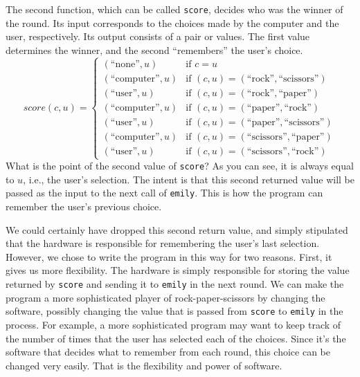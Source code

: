 The second function, which can be called \texttt{score}, decides who
was the winner of the round.  Its input corresponds to the choices
made by the computer and the user, respectively.  Its output consists
of a pair or values.  The first value determines the winner, and the
second ``remembers'' the user's choice.
\begin{displaymath}
score(c,u) =
   \left\{
        \begin{array}{ll}
        (\mbox{``none''}, u)     & \mbox{if } c = u \\
        (\mbox{``computer''}, u) & \mbox{if } (c,u) = (\mbox{``rock''}, \mbox{``scissors''}) \\
        (\mbox{``user''}, u)     & \mbox{if } (c,u) = (\mbox{``rock''}, \mbox{``paper''}) \\
        (\mbox{``computer''}, u) & \mbox{if } (c,u) = (\mbox{``paper''}, \mbox{``rock''}) \\
        (\mbox{``user''}, u)     & \mbox{if } (c,u) = (\mbox{``paper''}, \mbox{``scissors''}) \\
        (\mbox{``computer''}, u) & \mbox{if } (c,u) = (\mbox{``scissors''}, \mbox{``paper''}) \\
        (\mbox{``user''}, u)     & \mbox{if } (c,u) = (\mbox{``scissors''}, \mbox{``rock''})
        \end{array}
   \right.
\end{displaymath}
What is the point of the second value of \texttt{score}?  As you can
see, it is always equal to $u$, i.e., the user's selection.  The
intent is that this second returned value will be passed as the input
to the next call of \texttt{emily}.  This is how the program can
remember the user's previous choice.

We could certainly have dropped this second return value, and simply
stipulated that the hardware is responsible for remembering
the user's last selection.  However, we chose to write the program
in this way for two reasons.  First, it gives us more flexibility.
The hardware is simply responsible for storing the value returned
by \texttt{score} and sending it to \texttt{emily} in the next round.
We can make the program a more sophisticated player of
rock-paper-scissors by changing the software, possibly changing the
value that is passed from \texttt{score} to \texttt{emily} in the
process.  For example, a more sophisticated program may want to
keep track of the number of times that the user has selected each of
the choices.  Since it's the software that decides what to remember
from each round, this choice can be changed very easily.  That is
the flexibility and power of software.

